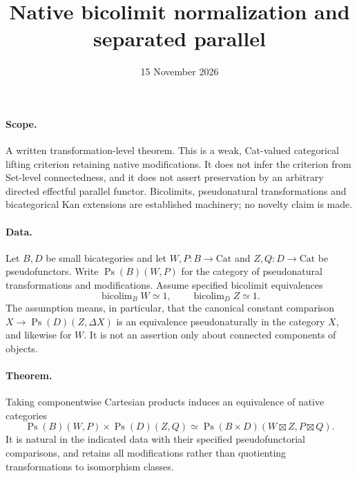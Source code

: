\documentclass{article}
\title{Native bicolimit normalization and separated parallel}
\date{15 November 2026}
\begin{document}
\maketitle
\paragraph{Scope.} A written transformation-level theorem. This is a weak, Cat-valued categorical lifting criterion retaining native modifications. It does not infer the criterion from Set-level connectedness, and it does not assert preservation by an arbitrary directed effectful parallel functor. Bicolimits, pseudonatural transformations and bicategorical Kan extensions are established machinery; no novelty claim is made.

\paragraph{Data.} Let $B,D$ be small bicategories and let $W,P:B\to\mathrm{Cat}$ and $Z,Q:D\to\mathrm{Cat}$ be pseudofunctors. Write $\operatorname{Ps}(B)(W,P)$ for the category of pseudonatural transformations and modifications. Assume specified bicolimit equivalences
\[
 \operatorname{bicolim}_B W\simeq1,
 \qquad\operatorname{bicolim}_D Z\simeq1.
\]
The assumption means, in particular, that the canonical constant comparison $X\to\operatorname{Ps}(D)(Z,\Delta X)$ is an equivalence pseudonaturally in the category $X$, and likewise for $W$. It is not an assertion only about connected components of objects.

\paragraph{Theorem.} Taking componentwise Cartesian products induces an equivalence of native categories
\[
 \operatorname{Ps}(B)(W,P)\times\operatorname{Ps}(D)(Z,Q)
 \simeq\operatorname{Ps}(B\times D)(W\boxtimes Z,P\boxtimes Q).
\]
It is natural in the indicated data with their specified pseudofunctorial comparisons, and retains all modifications rather than quotienting transformations to isomorphism classes.
\end{document}
